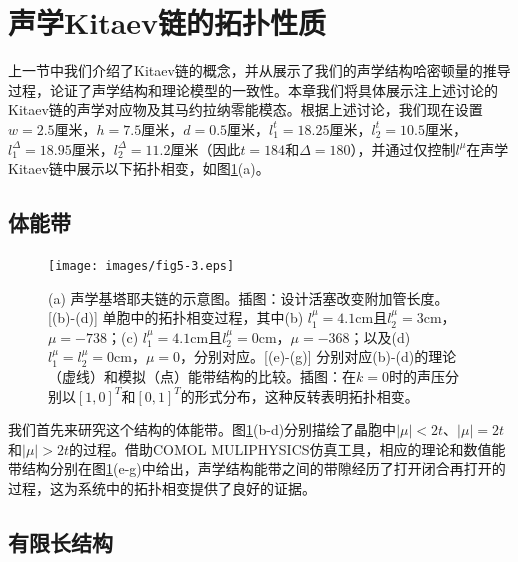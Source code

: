 \section{声学Kitaev链的拓扑性质}

上一节中我们介绍了Kitaev链的概念，并从展示了我们的声学结构哈密顿量的推导过程，论证了声学结构和理论模型的一致性。本章我们将具体展示注上述讨论的Kitaev链的声学对应物及其马约拉纳零能模态。根据上述讨论，我们现在设置\(w = 2.5\)厘米，\(h = 7.5\)厘米，\(d = 0.5\)厘米，\(l_{1}^{t} = 18.25\)厘米，\(l_{2}^{t} = 10.5\)厘米，\(l_{1}^{\Delta} = 18.95\)厘米，\(l_{2}^{\Delta} = 11.2\)厘米（因此\(t = 184\)和\({\Delta} = 180\)），并通过仅控制\(l^{\mu}\)在声学Kitaev链中展示以下拓扑相变，如图\ref{fig_5_3}(a)。

\subsection{体能带}

\begin{figure}[h!]
    \centering
    \texttt{[image: images/fig5-3.eps]} 
    \caption{(a) 声学基塔耶夫链的示意图。插图：设计活塞改变附加管长度。[(b)-(d)] 单胞中的拓扑相变过程，其中(b) $l_1^{\mu} = 4.1$cm且$l_2^{\mu} = 3$cm，$\mu = -738$；(c) $l_1^{\mu} = 4.1$cm且$l_2^{\mu} = 0$cm，$\mu = -368$；以及(d) $l_1^{\mu} = l_2^{\mu} = 0$cm，$\mu = 0$，分别对应。[(e)-(g)] 分别对应(b)-(d)的理论（虚线）和模拟（点）能带结构的比较。插图：在$k = 0$时的声压分别以$[1, 0]^T$和$[0, 1]^T$的形式分布，这种反转表明拓扑相变。}
    \label{fig_5_3}
\end{figure}

我们首先来研究这个结构的体能带。图\ref{fig_5_3}(b-d)分别描绘了晶胞中\(\vert \mu \vert < 2t\)、\(\vert \mu \vert = 2t\)和\(\vert \mu \vert > 2t\)的过程。借助COMOL MULIPHYSICS仿真工具，相应的理论和数值能带结构分别在图\ref{fig_5_3}(e-g)中给出，声学结构能带之间的带隙经历了打开闭合再打开的过程，这为系统中的拓扑相变提供了良好的证据。

\subsection{有限长结构}

